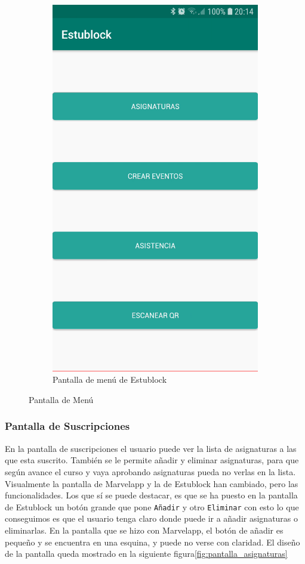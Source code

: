 \begin{figure}[hbt]
\begin{subfigure}[b]{0.4\linewidth}
        \includegraphics[width=0.7\linewidth]{figs/Desarrollo/Interfaz/estublock_menu}
        \caption[Estublock Menú]{Pantalla de menú de Estublock}
	\end{subfigure} 
	\caption[Pantalla de Menú]{Pantalla de Menú}
	\label{fig:pantalla_menu}
\end{figure}

\subsubsection{Pantalla de Suscripciones}

En la pantalla de suscripciones el usuario puede ver la lista de asignaturas a las que esta suscrito. También se le permite añadir y eliminar asignaturas, para que según avance el curso y vaya aprobando asignaturas pueda no verlas en la lista. Visualmente la pantalla de Marvelapp y la de Estublock han cambiado, pero las funcionalidades. Los que sí se puede destacar, es que se ha puesto en la pantalla de Estublock un botón grande que pone \verb|Añadir| y otro \verb|Eliminar| con esto lo que conseguimos es que el usuario tenga claro donde puede ir a añadir asignaturas o eliminarlas. En la pantalla que se hizo con Marvelapp, el botón de añadir es pequeño y se encuentra en una esquina, y puede no verse con claridad. El diseño de la pantalla queda mostrado en la siguiente figura\ref{fig:pantalla_asignaturas}

